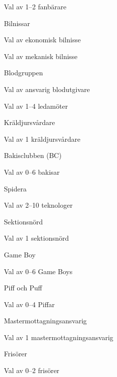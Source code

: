 \documentclass{sektionsmote}
\begin{document}
\begin{ootd}
\begin{ootd}
\begin{ootd}
        \item Val av 1--2 fanbärare
    \end{ootd}
    \item Bilnissar
    \begin{ootd}
        \item Val av ekonomisk bilnisse
        \item Val av mekanisk bilnisse
    \end{ootd}
    \item Blodgruppen
    \begin{ootd}
        \item Val av ansvarig blodutgivare
        \item Val av 1--4 ledamöter
    \end{ootd}
    \item Kräldjursvårdare
    \begin{ootd}
        \item Val av 1 kräldjursvårdare
    \end{ootd}
    \item Bakisclubben (BC)
    \begin{ootd}
        \item Val av 0--6 bakisar
    \end{ootd}
    \item Spidera
    \begin{ootd}
        \item Val av 2--10 teknologer
    \end{ootd}
    \item Sektionsnörd
    \begin{ootd}
        \item Val av 1 sektionsnörd
    \end{ootd}
    \item Game Boy
    \begin{ootd}
        \item Val av 0--6 Game Boys
    \end{ootd}
    \item Piff och Puff
    \begin{ootd}
        \item Val av 0--4 Piffar
    \end{ootd}
    \item Mastermottagningsansvarig
    \begin{ootd}
        \item Val av 1 mastermottagningsansvarig
    \end{ootd}
    \item Frisörer
    \begin{ootd}
        \item Val av 0--2 frisörer
    \end{ootd}
\end{ootd}


\end{ootd}
\end{document}
